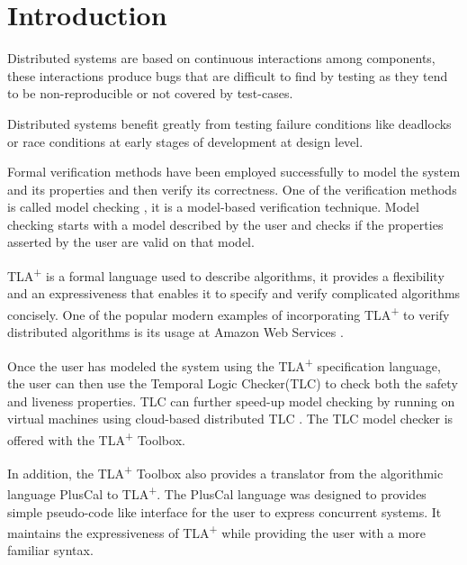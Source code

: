 \documentclass{thesul}
\newcommand{\tlaplus}{TLA\textsuperscript{+}\xspace}
\begin{document}
\tableofcontents

\NoChapterHead


\mainmatter


\chapter{Introduction}

Distributed systems are based on continuous interactions among components, these interactions produce bugs that are difficult to find by testing as they tend to be non-reproducible or not covered by test-cases.

Distributed systems benefit greatly from testing failure conditions like deadlocks or race conditions at early stages of development at design level.

Formal verification methods have been employed successfully to model the system and its properties and then verify its correctness. One of the verification methods is called model checking \cite{ModelCheckingTLA}, it is a model-based verification technique. Model checking starts with a model described by the user and checks if the properties asserted by the user are valid on that model. 

\tlaplus is a formal language used to describe algorithms, it provides a flexibility and an expressiveness that enables it to specify and verify complicated algorithms concisely. One of the popular modern examples of incorporating \tlaplus to verify distributed algorithms is its usage at Amazon Web Services \cite{amazon}.

Once the user has modeled the system using the \tlaplus specification language, the user can then use the Temporal Logic Checker(TLC) to check both the safety and liveness properties. TLC can further speed-up model checking by running on virtual machines using cloud-based distributed TLC \cite{cloudTLC}. The TLC model checker is offered with the \tlaplus Toolbox. 

In addition, the \tlaplus Toolbox also provides a translator from the algorithmic language PlusCal to \tlaplus. The PlusCal language was designed to provides simple pseudo-code like interface for the user to express concurrent systems. It maintains the expressiveness of \tlaplus while providing the user with a more familiar syntax.
\end{document}
